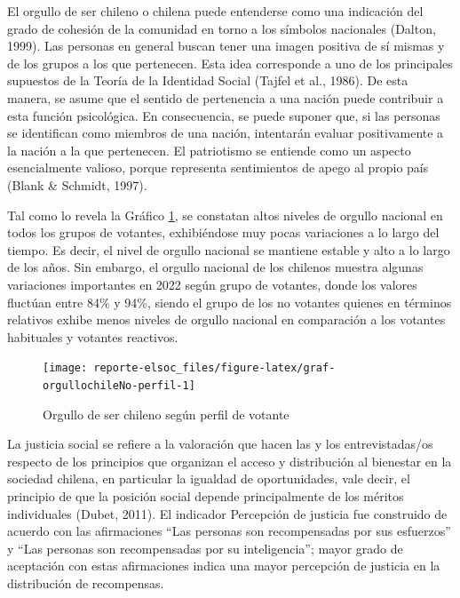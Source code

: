\documentclass[
  12pt,
]{book}
\begin{document}
El orgullo de ser chileno o chilena puede entenderse como una indicación del grado de cohesión de la comunidad en torno a los símbolos nacionales (Dalton, 1999). Las personas en general buscan tener una imagen positiva de sí mismas y de los grupos a los que pertenecen. Esta idea corresponde a uno de los principales supuestos de la Teoría de la Identidad Social (Tajfel et al., 1986). De esta manera, se asume que el sentido de pertenencia a una nación puede contribuir a esta función psicológica. En consecuencia, se puede suponer que, si las personas se identifican como miembros de una nación, intentarán evaluar positivamente a la nación a la que pertenecen. El patriotismo se entiende como un aspecto esencialmente valioso, porque representa sentimientos de apego al propio país (Blank \& Schmidt, 1997).

Tal como lo revela la Gráfico \ref{fig:graf-orgullochileNo-perfil}, se constatan altos niveles de orgullo nacional en todos los grupos de votantes, exhibiéndose muy pocas variaciones a lo largo del tiempo. Es decir, el nivel de orgullo nacional se mantiene estable y alto a lo largo de los años. Sin embargo, el orgullo nacional de los chilenos muestra algunas variaciones importantes en 2022 según grupo de votantes, donde los valores fluctúan entre 84\% y 94\%, siendo el grupo de los no votantes quienes en términos relativos exhibe menos niveles de orgullo nacional en comparación a los votantes habituales y votantes reactivos.

\begin{figure}

{\centering \texttt{[image: reporte-elsoc\_files/figure-latex/graf-orgullochileNo-perfil-1]} 

}

\caption{Orgullo de ser chileno según perfil de votante}\label{fig:graf-orgullochileNo-perfil}
\end{figure}

La justicia social se refiere a la valoración que hacen las y los entrevistadas/os respecto de los principios que organizan el acceso y distribución al bienestar en la sociedad chilena, en particular la igualdad de oportunidades, vale decir, el principio de que la posición social depende principalmente de los méritos individuales (Dubet, 2011). El indicador Percepción de justicia fue construido de acuerdo con las afirmaciones ``Las personas son recompensadas por sus esfuerzos'' y ``Las personas son recompensadas por su inteligencia''; mayor grado de aceptación con estas afirmaciones indica una mayor percepción de justicia en la distribución de recompensas.
\end{document}

